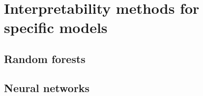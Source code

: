 \chapter{Interpretability methods for specific models}

\section{Random forests}
\section{Neural networks}

